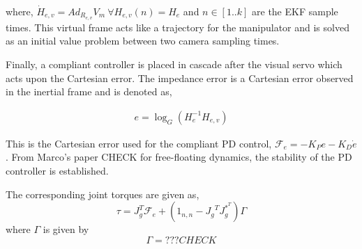 where,  $\dot{H}_{e,v} = Ad_{R_{e,v}}V_m~ \forall H_{e,v}(n) = H_e$ and $n \in [1..k]$ are the EKF sample times. This virtual frame acts like a trajectory for the manipulator and is solved as an initial value problem between two camera sampling times.

Finally, a compliant controller is placed in cascade after the visual servo which acts upon the Cartesian error. The impedance error is a Cartesian error observed in the inertial frame and is denoted as,

\begin{align}
 e = \log_G(H_e^{-1}H_{e,v})
\end{align}
 
This is the Cartesian error used for the compliant PD control, $\mathcal{F}_e = -K_Pe - K_D\dot{e}$. From Marco's paper CHECK for free-floating dynamics, the stability of the PD controller is established. 

The corresponding joint torques are given as,
\begin{equation}
\tau = J_g^T\mathcal{F}_e + (1_{n,n}-{J_g}^TJ_g^{*^T})\Gamma
\end{equation}
where $\Gamma$ is given by
\begin{equation}
\Gamma = ??? CHECK
\end{equation}


%
%
%
%
%
%	
